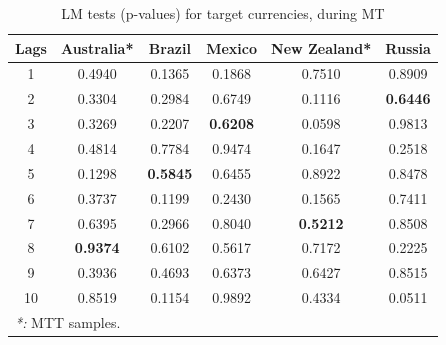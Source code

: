 \documentclass[a4paper, twoside]{templates/ociamthesis}
\begin{document}
\begin{table}[H]

\caption{\label{tab:LM3}LM tests (p-values) for target currencies, during MT}
\centering
\fontsize{10}{12}\selectfont
\begin{tabular}[t]{cccccc}
\toprule
Lags & Australia* & Brazil & Mexico & New Zealand* & Russia\\
\midrule
1 & 0.4940 & 0.1365 & 0.1868 & 0.7510 & 0.8909\\
2 & 0.3304 & 0.2984 & 0.6749 & 0.1116 & \textbf{0.6446}\\
3 & 0.3269 & 0.2207 & \textbf{0.6208} & 0.0598 & 0.9813\\
4 & 0.4814 & 0.7784 & 0.9474 & 0.1647 & 0.2518\\
5 & 0.1298 & \textbf{0.5845} & 0.6455 & 0.8922 & 0.8478\\
6 & 0.3737 & 0.1199 & 0.2430 & 0.1565 & 0.7411\\
7 & 0.6395 & 0.2966 & 0.8040 & \textbf{0.5212} & 0.8508\\
8 & \textbf{0.9374} & 0.6102 & 0.5617 & 0.7172 & 0.2225\\
9 & 0.3936 & 0.4693 & 0.6373 & 0.6427 & 0.8515\\
10 & 0.8519 & 0.1154 & 0.9892 & 0.4334 & 0.0511\\
\bottomrule
\multicolumn{6}{l}{\rule{0pt}{1em}\textit{*: } MTT samples. }\\
\end{tabular}
\end{table}

\clearpage
\end{document}
